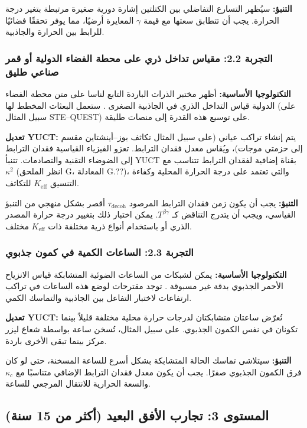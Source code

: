 \documentclass[11pt,a4paper]{article}
\newcommand{\Keff}{K_{\mathrm{eff}}}
\begin{document}
	\textbf{التنبؤ:} سيُظهر التسارع التفاضلي بين الكتلتين إشارة دورية صغيرة مرتبطة بتغير درجة الحرارة. يجب أن تتطابق سعتها مع قيمة $\gamma$ المعايرة أرضيًا، مما يوفر تحققًا فضائيًا للرابط بين الحرارة والجاذبية.
	
	\subsubsection{التجربة 2.2: مقياس تداخل ذري على محطة الفضاء الدولية أو قمر صناعي طليق}
	
	\textbf{التكنولوجيا الأساسية:} أظهر مختبر الذرات الباردة التابع لناسا على متن محطة الفضاء الدولية قياس التداخل الذري في الجاذبية الصغرى \cite{Aveline2020}. ستعمل البعثات المخطط لها (على سبيل المثال STE–QUEST) على توسيع هذه القدرة إلى منصات طليقة.
	
	\textbf{تعديل YUCT:} يتم إنشاء تراكب عياني (على سبيل المثال تكاثف بوز–أينشتاين مقسم إلى حزمتي موجات)، ويُقاس معدل فقدان الترابط. تعزو الفيزياء القياسية فقدان الترابط إلى الضوضاء التقنية والتصادمات. تتنبأ YUCT بقناة إضافية لفقدان الترابط تتناسب مع $\kappa^2$ (انظر الملحق G، المعادلة G.??)، والتي تعتمد على درجة الحرارة المحلية وكفاءة التنسيق $\Keff$ للتكاثف.
	
	\textbf{التنبؤ:} يجب أن يكون زمن فقدان الترابط المرصود $\tau_{\mathrm{decoh}}$ أقصر بشكل منهجي من التنبؤ القياسي، ويجب أن يتدرج التناقض كـ $T^{\beta\gamma}$. يمكن اختبار ذلك بتغيير درجة حرارة المصدر الذري أو باستخدام أنواع ذرية مختلفة ذات $\Keff$ مختلف.
	
	\subsubsection{التجربة 2.3: الساعات الكمية في كمون جذبوي}
	
	\textbf{التكنولوجيا الأساسية:} يمكن لشبكات من الساعات الضوئية المتشابكة قياس الانزياح الأحمر الجذبوي بدقة غير مسبوقة \cite{Katori2021}. توجد مقترحات لوضع هذه الساعات في تراكب ارتفاعات لاختبار التفاعل بين الجاذبية والتماسك الكمي.
	
	\textbf{تعديل YUCT:} تُعرّض ساعتان متشابكتان لدرجات حرارة محلية مختلفة قليلاً بينما تكونان في نفس الكمون الجذبوي. على سبيل المثال، تُسخن ساعة بواسطة شعاع ليزر مركز بينما تبقى الأخرى باردة.
	
	\textbf{التنبؤ:} سيتلاشى تماسك الحالة المتشابكة بشكل أسرع للساعة المسخنة، حتى لو كان فرق الكمون الجذبوي صفرًا. يجب أن يكون معدل فقدان الترابط الإضافي متناسبًا مع $\kappa_c$ والسعة الحرارية للانتقال المرجعي للساعة.
	
	\subsection{المستوى 3: تجارب الأفق البعيد (أكثر من 15 سنة)}
	\label{subsec:far-tests}
	
\end{document}
